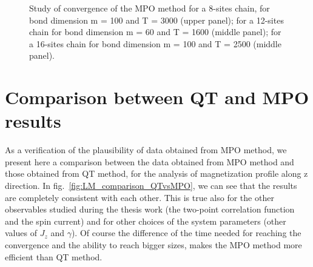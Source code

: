 \begin{figure}[H]
\captionsetup{width=1.\linewidth}
\caption{Study of convergence of the MPO method for a 8-sites chain, for bond dimension m = 100 and T = 3000 (upper panel); for a 12-sites chain for bond dimension m = 60 and T = 1600 (middle panel); for a 16-sites chain for bond dimension m = 100 and T = 2500 (middle panel).}
\label{fig:convergence_8_12_16}
\end{figure}


\section{Comparison between QT and MPO results}
As a verification of the plausibility of data obtained from MPO method, we present here a comparison between the data obtained from MPO method and those obtained from QT method, for the analysis of magnetization profile along z direction. In fig.~\ref{fig:LM_comparison_QTvsMPO}, we can see that the results are completely consistent with each other. This is true also for the other observables studied during the thesis work (the two-point correlation function and the spin current) and for other choices of the system parameters (other values of $J_z$ and $\gamma$). Of course the difference of the time needed for reaching the convergence and the ability to reach bigger sizes, makes the MPO method more efficient than QT method.

